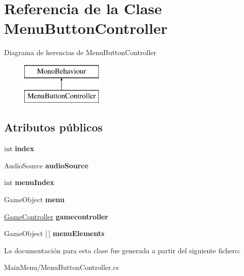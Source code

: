 \hypertarget{class_menu_button_controller}{}\section{Referencia de la Clase Menu\+Button\+Controller}
\label{class_menu_button_controller}
Diagrama de herencias de Menu\+Button\+Controller\begin{figure}[H]
\begin{center}
\leavevmode
\includegraphics[height=2.000000cm]{class_menu_button_controller}
\end{center}
\end{figure}
\subsection*{Atributos públicos}
\begin{DoxyCompactItemize}
\item 
\mbox{\label{class_menu_button_controller_a9ace41802cf1208b58b273b7b1899cde}} 
int {\bfseries index}
\item 
\mbox{\label{class_menu_button_controller_a376d6b46942d5c13b82f65ffe72a08e7}} 
Audio\+Source {\bfseries audio\+Source}
\item 
\mbox{\label{class_menu_button_controller_a3dbec2d2050f0a3ae193a24d4c0de476}} 
int {\bfseries menu\+Index}
\item 
\mbox{\label{class_menu_button_controller_a75259744d220166be13ba3340b1e05e0}} 
Game\+Object {\bfseries menu}
\item 
\mbox{\label{class_menu_button_controller_a1b393f1815311786b80cc8606ea37dfe}} 
\mbox{\hyperlink{class_game_controller}{Game\+Controller}} {\bfseries gamecontroller}
\item 
\mbox{\label{class_menu_button_controller_a9202fbe7e5774bb7bef40bf902fc54b1}} 
Game\+Object \mbox{[}$\,$\mbox{]} {\bfseries menu\+Elements}
\end{DoxyCompactItemize}


La documentación para esta clase fue generada a partir del siguiente fichero\+:\begin{DoxyCompactItemize}
\item 
Main\+Menu/Menu\+Button\+Controller.\+cs\end{DoxyCompactItemize}
